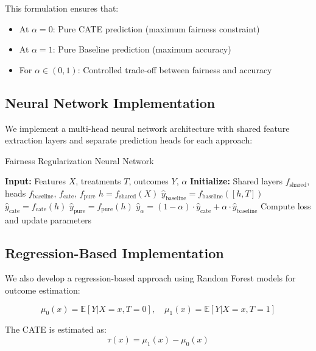 \documentclass{article} %
\begin{document}
This formulation ensures that:
\begin{itemize}
\item At $\alpha = 0$: Pure CATE prediction (maximum fairness constraint)
\item At $\alpha = 1$: Pure Baseline prediction (maximum accuracy)
\item For $\alpha \in (0,1)$: Controlled trade-off between fairness and accuracy
\end{itemize}

\subsection{Neural Network Implementation}

We implement a multi-head neural network architecture with shared feature extraction layers and separate prediction heads for each approach:

\begin{algorithm}
\caption{Fairness Regularization Neural Network}
\begin{algorithmic}
\STATE \textbf{Input:} Features $X$, treatments $T$, outcomes $Y$, $\alpha$
\STATE \textbf{Initialize:} Shared layers $f_{\text{shared}}$, heads $f_{\text{baseline}}$, $f_{\text{cate}}$, $f_{\text{pure}}$
    \STATE $h = f_{\text{shared}}(X)$
    \STATE $\hat{y}_{\text{baseline}} = f_{\text{baseline}}([h, T])$
    \STATE $\hat{y}_{\text{cate}} = f_{\text{cate}}(h)$
    \STATE $\hat{y}_{\text{pure}} = f_{\text{pure}}(h)$
    \STATE $\hat{y}_{\alpha} = (1-\alpha) \cdot \hat{y}_{\text{cate}} + \alpha \cdot \hat{y}_{\text{baseline}}$
    \STATE Compute loss and update parameters
\ENDFOR
\end{algorithmic}
\end{algorithm}

\subsection{Regression-Based Implementation}

We also develop a regression-based approach using Random Forest models for outcome estimation:

\begin{equation}
\mu_0(x) = \mathbb{E}[Y|X=x, T=0], \quad \mu_1(x) = \mathbb{E}[Y|X=x, T=1]
\end{equation}

The CATE is estimated as:
\begin{equation}
\tau(x) = \mu_1(x) - \mu_0(x)
\end{equation}
\end{document}
